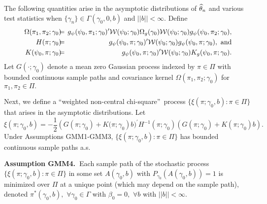 \documentclass[12pt,titlepage,final,oneside,letterpaper]{article}
\begin{document}
The following quantities arise in the asymptotic distributions of $\widehat{%
\theta }_{n}$ and various test statistics when $\{\gamma _{n}\}\in \Gamma
(\gamma _{0},0,b)$ and $||b||<\infty .$ Define%
\begin{eqnarray}
\Omega (\pi _{1},\pi _{2};\gamma _{0})\hspace{-0.08in} &=&\hspace{-0.08in}%
g_{\psi }(\psi _{0},\pi _{1};\gamma _{0})^{\prime }\mathcal{W}(\psi
_{0};\gamma _{0})\Omega _{g}(\gamma _{0})\mathcal{W}(\psi _{0};\gamma
_{0})g_{\psi }(\psi _{0},\pi _{2};\gamma _{0}),  \notag \\
H(\pi ;\gamma _{0})\hspace{-0.08in} &=&\hspace{-0.08in}g_{\psi }(\psi
_{0},\pi ;\gamma _{0})^{\prime }\mathcal{W}(\psi _{0};\gamma _{0})g_{\psi
}(\psi _{0},\pi ;\gamma _{0}),\text{ and}  \notag \\
K(\psi _{0},\pi ;\gamma _{0})\hspace{-0.08in} &=&\hspace{-0.08in}g_{\psi
}(\psi _{0},\pi ;\gamma _{0})^{\prime }\mathcal{W}(\psi _{0};\gamma
_{0})K_{g}(\psi _{0},\pi ;\gamma _{0}).  \label{Omega, H, and K defns}
\end{eqnarray}%
Let $G(\cdot ;\gamma _{0})$ denote a mean zero Gaussian process indexed by $%
\pi \in \Pi $ with bounded continuous sample paths and covariance kernel $%
\Omega (\pi _{1},\pi _{2};\gamma _{0})$ for $\pi _{1},\pi _{2}\in \Pi .$

Next, we define a \textquotedblleft weighted non-central
chi-square\textquotedblright\ process $\{\xi (\pi ;\gamma _{0},b):\pi \in
\Pi \}$ that arises in the asymptotic distributions. Let%
\begin{equation}
\xi (\pi ;\gamma _{0},b)=-\frac{1}{2}\left( G(\pi ;\gamma _{0})+K(\pi
;\gamma _{0}\right) b)^{\prime }H^{-1}(\pi ;\gamma _{0})\left( G(\pi ;\gamma
_{0})+K(\pi ;\gamma _{0})b\right) .  \label{Defn of Xi Stoch Process}
\end{equation}%
Under Assumptions GMM1-GMM3, $\{\xi (\pi ;\gamma _{0},b):\pi \in \Pi \}$ has
bounded continuous sample paths a.s.\medskip

\noindent \textbf{Assumption GMM4.\ }Each sample path of the stochastic
process $\{\xi (\pi ;\gamma _{0},b):\pi \in \Pi \}$ in some set $A(\gamma
_{0},b)$ with $P_{\gamma _{0}}(A(\gamma _{0},b))=1$ is minimized over $\Pi $
at a unique point (which may depend on the sample path), denoted $\pi ^{\ast
}(\gamma _{0},b),$ $\forall \gamma _{0}\in \Gamma $ with $\beta _{0}=0,$ $%
\forall b$ with $||b||<\infty .$\medskip
\end{document}
